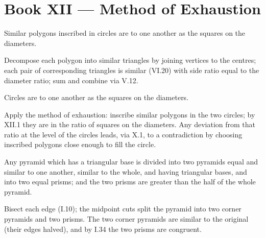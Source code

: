 \documentclass{rrxiv}
\begin{document}
\section{Book XII --- Method of Exhaustion}
\label{sec:book-XII}

\begin{claim}
\label{prop:XII.1}
Similar polygons inscribed in circles are to one another as the
squares on the diameters.
\end{claim}
\begin{evidence}
\label{ev:XII.1}
Decompose each polygon into similar triangles by joining vertices to
the centres; each pair of corresponding triangles is similar (VI.20)
with side ratio equal to the diameter ratio; sum and combine via
V.12.
\end{evidence}

\begin{claim}
\label{prop:XII.2}
Circles are to one another as the squares on the diameters.
\end{claim}
\begin{evidence}
\label{ev:XII.2}
Apply the method of exhaustion: inscribe similar polygons in the two
circles; by XII.1 they are in the ratio of squares on the diameters.
Any deviation from that ratio at the level of the circles leads, via
X.1, to a contradiction by choosing inscribed polygons close enough
to fill the circle.
\end{evidence}

\begin{claim}
\label{prop:XII.3}
Any pyramid which has a triangular base is divided into two pyramids
equal and similar to one another, similar to the whole, and having
triangular bases, and into two equal prisms; and the two prisms are
greater than the half of the whole pyramid.
\end{claim}
\begin{evidence}
\label{ev:XII.3}
Bisect each edge (I.10); the midpoint cuts split the pyramid into
two corner pyramids and two prisms.  The two corner pyramids are
similar to the original (their edges halved), and by I.34 the two
prisms are congruent.
\end{evidence}
\end{document}
